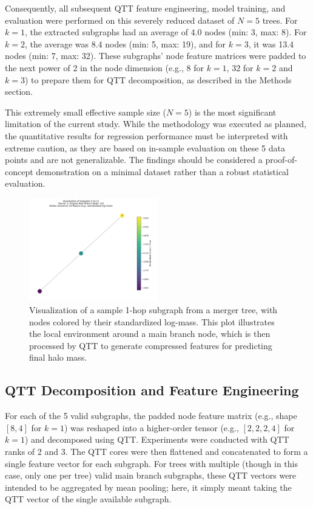 \documentclass[twocolumn]{aastex631}
\begin{document}
Consequently, all subsequent QTT feature engineering, model training, and evaluation were performed on this severely reduced dataset of $N=5$ trees. For $k=1$, the extracted subgraphs had an average of 4.0 nodes (min: 3, max: 8). For $k=2$, the average was 8.4 nodes (min: 5, max: 19), and for $k=3$, it was 13.4 nodes (min: 7, max: 32). These subgraphs' node feature matrices were padded to the next power of 2 in the node dimension (e.g., 8 for $k=1$, 32 for $k=2$ and $k=3$) to prepare them for QTT decomposition, as described in the Methods section.

This extremely small effective sample size ($N=5$) is the most significant limitation of the current study. While the methodology was executed as planned, the quantitative results for regression performance must be interpreted with extreme caution, as they are based on in-sample evaluation on these 5 data points and are not generalizable. The findings should be considered a proof-of-concept demonstration on a minimal dataset rather than a robust statistical evaluation.

\begin{figure}[h!]
    \centering
    \includegraphics[width=0.5\textwidth]{../input_files/plots/subgraph_vis_k1_idx0_5_20250524-175501.png}
    \caption{Visualization of a sample 1-hop subgraph from a merger tree, with nodes colored by their standardized log-mass. This plot illustrates the local environment around a main branch node, which is then processed by QTT to generate compressed features for predicting final halo mass.
}
    \label{fig:subgraph_vis}
\end{figure}

\subsection{QTT Decomposition and Feature Engineering}

For each of the 5 valid subgraphs, the padded node feature matrix (e.g., shape $[8, 4]$ for $k=1$) was reshaped into a higher-order tensor (e.g., $[2, 2, 2, 4]$ for $k=1$) and decomposed using QTT. Experiments were conducted with QTT ranks of 2 and 3. The QTT cores were then flattened and concatenated to form a single feature vector for each subgraph. For trees with multiple (though in this case, only one per tree) valid main branch subgraphs, these QTT vectors were intended to be aggregated by mean pooling; here, it simply meant taking the QTT vector of the single available subgraph.
\end{document}
